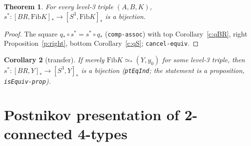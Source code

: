 \documentclass[11pt]{amsart}
\newtheorem{theorem}{Theorem}
\newtheorem{corollary}[theorem]{Corollary}
\theoremstyle{definition}
\theoremstyle{remark}
\newcommand{\code}[1]{\texttt{#1}}
\newcommand{\hc}[2]{[#1,#2]_*}
\newcommand{\Fib}{\mathrm{Fib}}
\begin{document}
\begin{theorem}\label{t:main}
For every level-3 triple $(A,B,K)$, $s^*:\hc{BR}{\Fib K}\to\hc{S^3}{\Fib K}$ is
a bijection.
\end{theorem}
\begin{proof}
The square $q_*\circ s^*=s^*\circ q_*$ (\code{comp-assoc}) with top
Corollary~\ref{c:qBR}, right Proposition~\ref{p:right}, bottom
Corollary~\ref{c:qS}; \code{cancel-equiv}.
\end{proof}

\begin{corollary}[transfer]\label{c:transfer}
If merely $\Fib K\simeq_*(Y,y_0)$ for some level-3 triple, then
$s^*:\hc{BR}Y\to\hc{S^3}Y$ is a bijection (\code{ptEqInd}; the statement is a
proposition, \code{isEquiv-prop}).
\end{corollary}

\section{Postnikov presentation of 2-connected 4-types}
\end{document}
